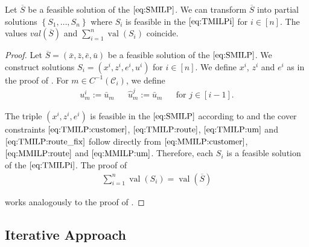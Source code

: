\begin{theorem}
\label{thm:equivalence_SMILP_TMILP}

Let $\overline{S}$ be a feasible solution of the $\eqref{eq:SMILP}$. We can transform $\overline{S}$ into partial solutions $\left\{S_1,\dots,S_n\right\}$ where $S_i$ is feasible in the $\eqref{eq:TMILPi}$ for ${i\in[n]}$. The values ${val}(\overline{S})$ and ${\sum_{i=1}^n \operatorname{val}\left(S_i\right)}$ coincide.

\end{theorem}

\begin{proof}

Let ${\overline{S}=\left(\bar{x},\bar{z},\bar{e},\bar{u}\right)}$ be a feasible solution of the $\eqref{eq:SMILP}$. We construct solutions ${S_i=\left(x^i,z^i,e^i,u^i\right)}$ for ${i\in[n]}$. We define $x^i$, $z^i$ and $e^i$ as in the proof of . For ${m\in C^{-1}\left(\mathcal{C}_i\right)}$, we define
\begin{align*}
	u^i_m := \bar{u}_m && \hat{u}^j_m := \bar{u}_m && \text{for } j\in[i-1].
\end{align*}

The triple $\left(x^i,z^i,e^i\right)$ is feasible in the $\eqref{eq:SMILP}$ according to  and the cover constraints $\eqref{eq:TMILP:customer}$, $\eqref{eq:TMILP:route}$, $\eqref{eq:TMILP:um}$ and $\eqref{eq:TMILP:route_fix}$ follow directly from $\eqref{eq:MMILP:customer}$, $\eqref{eq:MMILP:route}$ and $\eqref{eq:MMILP:um}$. Therefore, each $S_i$ is a feasible solution of the $\eqref{eq:TMILPi}$. The proof of
\begin{align*}
	\sum_{i=1}^n\operatorname{val}\left(S_i\right) = \operatorname{val}\left(\overline{S}\right)
\end{align*}

works analogously to the proof of .
%
\end{proof}


\subsection{Iterative Approach}
\label{sec:iterative_approach}

